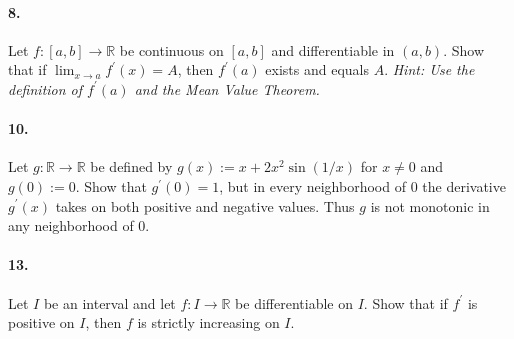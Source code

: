 \documentclass[12pt]{article}
\theoremstyle{remark}
\begin{document}
\paragraph{8.} Let $f:[a, b] \rightarrow \mathbb{R}$ be continuous on $[a, b]$ and differentiable in $(a, b)$. Show that if $\lim _{x \rightarrow a} f^{\prime}(x)=A$, then $f^{\prime}(a)$ exists and equals $A$. \emph{Hint: Use the definition of $f^{\prime}(a)$ and the Mean Value Theorem.}

\paragraph{10.} Let $g: \mathbb{R} \rightarrow \mathbb{R}$ be defined by $g(x):=x+2 x^2 \sin (1 / x)$ for $x \neq 0$ and $g(0):=0$. Show that $g^{\prime}(0)=1$, but in every neighborhood of 0 the derivative $g^{\prime}(x)$ takes on both positive and negative values. Thus $g$ is not monotonic in any neighborhood of 0.

\paragraph{13.} Let $I$ be an interval and let $f: I \rightarrow \mathbb{R}$ be differentiable on $I$. Show that if $f^{\prime}$ is positive on $I$, then $f$ is strictly increasing on $I$.
\end{document}
